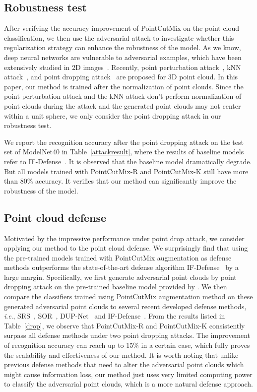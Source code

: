 \documentclass{article}
\newcommand{\ie}{\textit{i}.\textit{e}.}
\begin{document}
\subsection{Robustness test}
After verifying the accuracy improvement of PointCutMix on the point cloud classification, we then use the adversarial attack to investigate whether this regularization strategy can enhance the robustness of the model.
As we know, deep neural networks are vulnerable to adversarial examples, which have been extensively studied in 2D images~\cite{boostingad,adsurvey}. Recently, point perturbation attack~\cite{generatingadpoint}, kNN attack~\cite{knnattack}, and point dropping attack~\cite{pointcloudsaliencymaps} are proposed for 3D point cloud. In this paper, our method is trained after the normalization of point clouds. Since the point perturbation attack and the kNN attack don't perform normalization of point clouds during the attack and the generated point clouds may not center within a unit sphere, we only consider the point dropping attack in our robustness test. 

We report the recognition accuracy after the point dropping attack on the test set of ModelNet40 in Table~\ref{attackresult}, where the results of baseline models refer to IF-Defense~\cite{ifdefense}. 
It is observed that the baseline model dramatically degrade. But all models trained with PointCutMix-R and PointCutMix-K still have more than 80\% accuracy. It verifies that our method can significantly improve the robustness of the model.


\subsection{Point cloud defense}
Motivated by the impressive performance under point drop attack, we consider applying our method to the point cloud defense. We surprisingly find that using the pre-trained models trained with PointCutMix augmentation as defense methods outperforms the state-of-the-art defense algorithm IF-Defense~\cite{ifdefense} by a large margin. Specifically, we first generate adversarial point clouds by point dropping attack on the pre-trained baseline model provided by \cite{ifdefense}. We then compare the classifiers trained using PointCutMix augmentation method on these generated adversarial point clouds to several recent developed defense methods, \ie, SRS~\cite{adversarialpl}, SOR~\cite{dupnet}, DUP-Net~\cite{dupnet} and IF-Defense~\cite{ifdefense}. 
From the results listed in Table~\ref{drop}, we observe that PointCutMix-R and PointCutMix-K consistently surpass all defense methods under two point dropping attacks. The improvement of recognition accuracy can reach up to 15\% in a certain case, which fully proves the scalability and effectiveness of our method.
It is worth noting that unlike previous defense methods that need to alter the adversarial point clouds which might cause information loss, our method just uses very limited computing power to classify the adversarial point clouds, which is a more natural defense approach.
\end{document}

